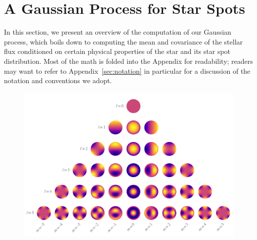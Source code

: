 \documentclass[modern]{aastex62}
\begin{document}
\section{A Gaussian Process for Star Spots}
\label{sec:main}

In this section, we present an overview of the computation of our Gaussian
process, which boils down to computing the mean and covariance of the stellar
flux conditioned on certain physical properties of the star and its star spot
distribution. Most of the math is folded into the Appendix for readability;
readers may want to refer to Appendix~\ref{sec:notation} in particular for
a discussion of the notation and conventions we adopt.

\begin{figure}[t!]
    \begin{centering}
        \includegraphics[width=\linewidth]{figures/ylms.pdf}
    \end{centering}
\end{figure}
\end{document}
